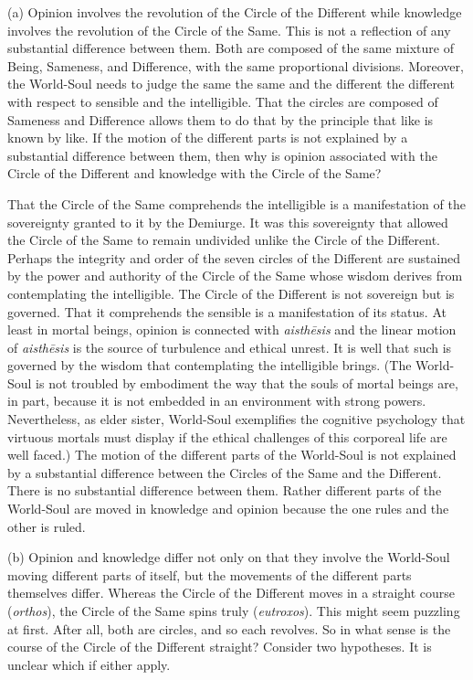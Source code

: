 (a) Opinion involves the revolution of the Circle of the Different while knowledge involves the revolution of the Circle of the Same. This is not a reflection of any substantial difference between them. Both are composed of the same mixture of Being, Sameness, and Difference, with the same proportional divisions. Moreover, the World-Soul needs to judge the same the same and the different the different with respect to sensible and the intelligible. That the circles are composed of Sameness and Difference allows them to do that by the principle that like is known by like. If the motion of the different parts is not explained by a substantial difference between them, then why is opinion associated with the Circle of the Different and knowledge with the Circle of the Same?

That the Circle of the Same comprehends the intelligible is a manifestation of the sovereignty granted to it by the Demiurge. It was this sovereignty that allowed the Circle of the Same to remain undivided unlike the Circle of the Different. Perhaps the integrity and order of the seven circles of the Different are sustained by the power and authority of the Circle of the Same whose wisdom derives from contemplating the intelligible. The Circle of the Different is not sovereign but is governed. That it comprehends the sensible is a manifestation of its status. At least in mortal beings, opinion is connected with \emph{aisthēsis} and the linear motion of \emph{aisthēsis} is the source of turbulence and ethical unrest. It is well that such is governed by the wisdom that contemplating the intelligible brings. (The World-Soul is not troubled by embodiment the way that the souls of mortal beings are, in part, because it is not embedded in an environment with strong powers. Nevertheless, as elder sister, World-Soul exemplifies the cognitive psychology that virtuous mortals must display if the ethical challenges of this corporeal life are well faced.) The motion of the different parts of the World-Soul is not explained by a substantial difference between the Circles of the Same and the Different. There is no substantial difference between them. Rather different parts of the World-Soul are moved in knowledge and opinion because the one rules and the other is ruled.

(b) Opinion and knowledge differ not only on that they involve the World-Soul moving different parts of itself, but the movements of the different parts themselves differ. Whereas the Circle of the Different moves in a straight course (\emph{orthos}), the Circle of the Same spins truly (\emph{eutroxos}). This might seem puzzling at first. After all, both are circles, and so each revolves. So in what sense is the course of the Circle of the Different straight? Consider two hypotheses. It is unclear which if either apply.

